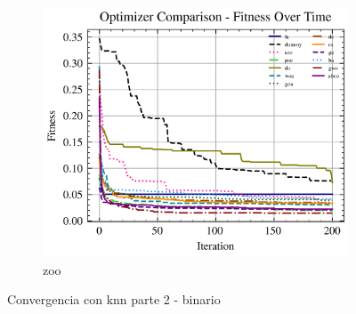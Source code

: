 \begin{figure}[htp]
    \begin{subfigure}[htp]{0.45\textwidth}
        \includegraphics[width=\textwidth]{imagenes/fitness_charts/img/binary/zoo/optimizers_fitness_knn.png}
        \caption{zoo}
        \label{fig:convergencia_zoo_knn}
    \end{subfigure}
    \caption{Convergencia con knn parte 2 - binario}
    \label{fig:convergencia_knn_2}
\end{figure}